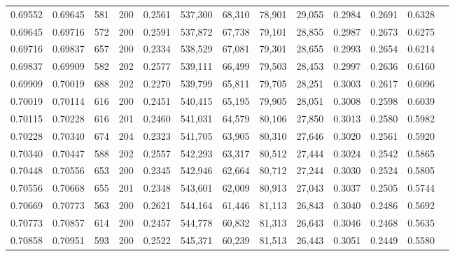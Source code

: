 \begin{tabular}{rrrrrrrrrrrrr}
0.69552 & 0.69645 &   581 & 200 &                                     0.2561 & 537,300 &  68,310 &  78,901 &  29,055 & 0.2984 & 0.2691 & 0.6328 \\
0.69645 & 0.69716 &   572 & 200 &                                     0.2591 & 537,872 &  67,738 &  79,101 &  28,855 & 0.2987 & 0.2673 & 0.6275 \\
0.69716 & 0.69837 &   657 & 200 &                                     0.2334 & 538,529 &  67,081 &  79,301 &  28,655 & 0.2993 & 0.2654 & 0.6214 \\
0.69837 & 0.69909 &   582 & 202 &                                     0.2577 & 539,111 &  66,499 &  79,503 &  28,453 & 0.2997 & 0.2636 & 0.6160 \\
0.69909 & 0.70019 &   688 & 202 &                                     0.2270 & 539,799 &  65,811 &  79,705 &  28,251 & 0.3003 & 0.2617 & 0.6096 \\
0.70019 & 0.70114 &   616 & 200 &                                     0.2451 & 540,415 &  65,195 &  79,905 &  28,051 & 0.3008 & 0.2598 & 0.6039 \\
0.70115 & 0.70228 &   616 & 201 &                                     0.2460 & 541,031 &  64,579 &  80,106 &  27,850 & 0.3013 & 0.2580 & 0.5982 \\
0.70228 & 0.70340 &   674 & 204 &                                     0.2323 & 541,705 &  63,905 &  80,310 &  27,646 & 0.3020 & 0.2561 & 0.5920 \\
0.70340 & 0.70447 &   588 & 202 &                                     0.2557 & 542,293 &  63,317 &  80,512 &  27,444 & 0.3024 & 0.2542 & 0.5865 \\
0.70448 & 0.70556 &   653 & 200 &                                     0.2345 & 542,946 &  62,664 &  80,712 &  27,244 & 0.3030 & 0.2524 & 0.5805 \\
0.70556 & 0.70668 &   655 & 201 &                                     0.2348 & 543,601 &  62,009 &  80,913 &  27,043 & 0.3037 & 0.2505 & 0.5744 \\
0.70669 & 0.70773 &   563 & 200 &                                     0.2621 & 544,164 &  61,446 &  81,113 &  26,843 & 0.3040 & 0.2486 & 0.5692 \\
0.70773 & 0.70857 &   614 & 200 &                                     0.2457 & 544,778 &  60,832 &  81,313 &  26,643 & 0.3046 & 0.2468 & 0.5635 \\
0.70858 & 0.70951 &   593 & 200 &                                     0.2522 & 545,371 &  60,239 &  81,513 &  26,443 & 0.3051 & 0.2449 & 0.5580 \\

\end{tabular}
